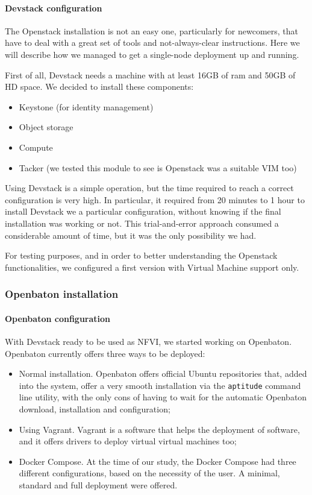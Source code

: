 \paragraph*{Devstack configuration}
The Openstack installation is not an easy one, particularly for newcomers, that 
have to deal with a great set of tools and not-always-clear instructions. Here 
we will describe how we managed to get a single-node deployment up and running.

First of all, Devstack needs a machine with at least 16GB of ram and 50GB of HD 
space.
We decided to install these components:
\begin{itemize}
 \item Keystone (for identity management)
 \item Object storage
 \item Compute
 \item Tacker (we tested this module to see is Openstack was a suitable VIM too)
\end{itemize}

Using Devstack is a simple operation, but the time required to reach a correct 
configuration is very high. In particular, it required from 20 minutes to 1 
hour to install Devstack we a particular configuration, without knowing if the 
final installation was working or not. This trial-and-error approach consumed a 
considerable amount of time, but it was the only possibility we had.

For testing purposes, and in order to better understanding the Openstack
functionalities, we configured a first version with Virtual Machine support
only.

\subsubsection{Openbaton installation}
\paragraph*{Openbaton configuration}
With Devstack ready to be used as NFVI, we started working on Openbaton.
Openbaton currently offers three ways to be deployed:
\begin{itemize}
  \item Normal installation. Openbaton offers official Ubuntu repositories that,
    added into the system, offer a very smooth installation via the
    \verb!aptitude! command line utility, with the only cons of having to wait
    for the automatic Openbaton download, installation and configuration;
  \item Using Vagrant. Vagrant is a software that helps the deployment of
    software, and it offers drivers to deploy virtual virtual machines too;
  \item Docker Compose. At the time of our study, the Docker Compose had three
    different configurations, based on the necessity of the user. A minimal,
    standard and full deployment were offered.
\end{itemize}

